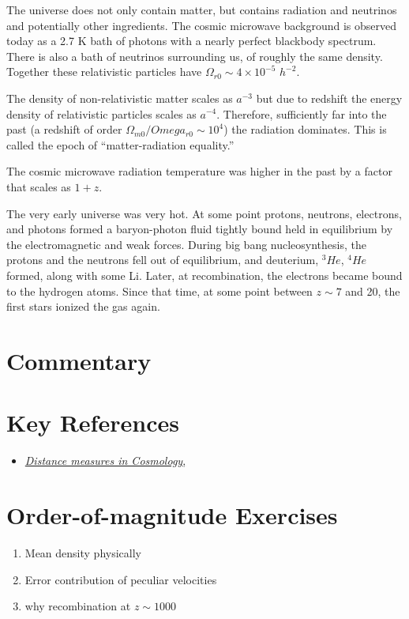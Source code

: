 The universe does not only contain matter, but contains radiation and
neutrinos and potentially other ingredients. The cosmic microwave
background is observed today as a 2.7 K bath of photons with a nearly
perfect blackbody spectrum.  There is also a bath of neutrinos
surrounding us, of roughly the same density. Together these
relativistic particles have $\Omega_{r0} \sim 4\times 10^{-5}$
$h^{-2}$.

The density of non-relativistic matter scales as $a^{-3}$ but due to
redshift the energy density of relativistic particles scales as
$a^{-4}$. Therefore, sufficiently far into the past (a redshift of
order $\Omega_{m0}/Omega_{r0} \sim 10^4$) the radiation
dominates. This is called the epoch of ``matter-radiation equality.''

The cosmic microwave radiation temperature was higher in the past by a
factor that scales as $1+z$.

The very early universe was very hot. At some point protons, neutrons,
electrons, and photons formed a baryon-photon fluid tightly bound held
in equilibrium by the electromagnetic and weak forces. During big bang
nucleosynthesis, the protons and the neutrons fell out of equilibrium,
and deuterium, ${}^3He$, ${}^4He$ formed, along with some Li. Later,
at recombination, the electrons became bound to the hydrogen
atoms. Since that time, at some point between $z\sim 7$ and 20, the
first stars ionized the gas again. 

\section{Commentary}

\section{Key References}

\begin{itemize}
  \item
    \href{http://adsabs.harvard.edu/abs/1999astro.ph..5116H}{
    {\it Distance measures in Cosmology},
      \citet{hogg99cosm}}
\end{itemize}

\citet{gunn06a}

\section{Order-of-magnitude Exercises}

\begin{enumerate} 
\item Mean density physically
\item Error contribution of peculiar velocities
\item why recombination at $z\sim 1000$
\end{enumerate} 

